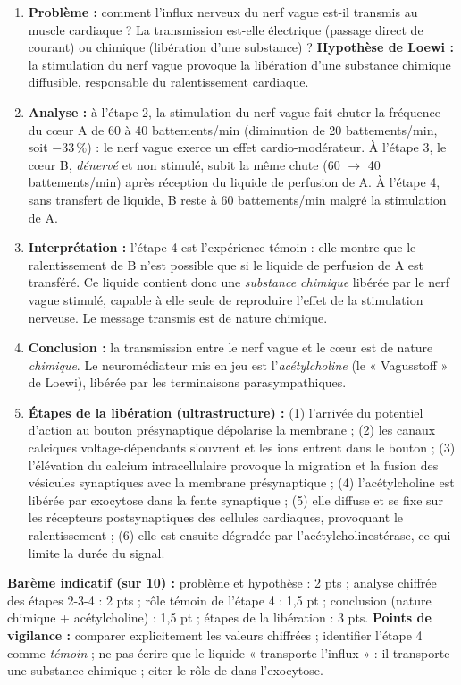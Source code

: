 \documentclass[11pt]{article}
\begin{document}
\begin{corrige}
\begin{enumerate}
\item \textbf{Problème :} comment l'influx nerveux du nerf vague est-il transmis au muscle cardiaque ? La transmission est-elle électrique (passage direct de courant) ou chimique (libération d'une substance) ? \textbf{Hypothèse de Loewi :} la stimulation du nerf vague provoque la libération d'une substance chimique diffusible, responsable du ralentissement cardiaque.
\item \textbf{Analyse :} à l'étape 2, la stimulation du nerf vague fait chuter la fréquence du cœur A de 60 à 40 battements/min (diminution de 20 battements/min, soit $-33\,\%$) : le nerf vague exerce un effet cardio-modérateur. À l'étape 3, le cœur B, \emph{dénervé} et non stimulé, subit la même chute (60 $\rightarrow$ 40 battements/min) après réception du liquide de perfusion de A. À l'étape 4, sans transfert de liquide, B reste à 60 battements/min malgré la stimulation de A.
\item \textbf{Interprétation :} l'étape 4 est l'expérience témoin : elle montre que le ralentissement de B n'est possible que si le liquide de perfusion de A est transféré. Ce liquide contient donc une \emph{substance chimique} libérée par le nerf vague stimulé, capable à elle seule de reproduire l'effet de la stimulation nerveuse. Le message transmis est de nature chimique.
\item \textbf{Conclusion :} la transmission entre le nerf vague et le cœur est de nature \emph{chimique}. Le neuromédiateur mis en jeu est l'\emph{acétylcholine} (le « Vagusstoff » de Loewi), libérée par les terminaisons parasympathiques.
\item \textbf{Étapes de la libération (ultrastructure) :} (1) l'arrivée du potentiel d'action au bouton présynaptique dépolarise la membrane ; (2) les canaux calciques voltage-dépendants s'ouvrent et les ions  entrent dans le bouton ; (3) l'élévation du calcium intracellulaire provoque la migration et la fusion des vésicules synaptiques avec la membrane présynaptique ; (4) l'acétylcholine est libérée par exocytose dans la fente synaptique ; (5) elle diffuse et se fixe sur les récepteurs postsynaptiques des cellules cardiaques, provoquant le ralentissement ; (6) elle est ensuite dégradée par l'acétylcholinestérase, ce qui limite la durée du signal.
\end{enumerate}
\textbf{Barème indicatif (sur 10) :} problème et hypothèse : 2 pts ; analyse chiffrée des étapes 2-3-4 : 2 pts ; rôle témoin de l'étape 4 : 1,5 pt ; conclusion (nature chimique + acétylcholine) : 1,5 pt ; étapes de la libération : 3 pts.
\textbf{Points de vigilance :} comparer explicitement les valeurs chiffrées ; identifier l'étape 4 comme \emph{témoin} ; ne pas écrire que le liquide « transporte l'influx » : il transporte une substance chimique ; citer le rôle de  dans l'exocytose.
\end{corrige}
\end{document}
